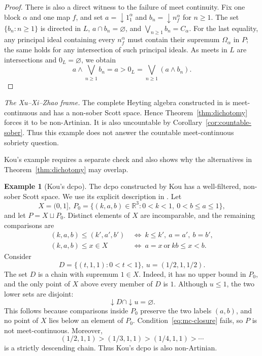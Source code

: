 \documentclass[11pt,reqno]{amsart}
\theoremstyle{definition}
\newtheorem{example}[theorem]{Example}
\numberwithin{equation}{section}
\begin{document}
\begin{proof}
There is also a direct witness to the failure of meet continuity.
Fix one block $\alpha$ and one map $f$, and set
$a={\downarrow}1_1^\alpha$ and $b_n={\downarrow}n_f^\alpha$
for $n\geq1$. The set $\{b_n:n\geq1\}$ is directed in $L$,
$a\cap b_n=\varnothing$, and $\bigvee_{n\geq1}b_n=C_\alpha$.
For the last equality, any principal ideal containing every
$n_f^\alpha$ must contain their supremum $\Omega_\alpha$ in $P$;
the same holds for any intersection of such principal ideals.
As meets in $L$ are intersections and $0_L=\varnothing$, we obtain
\begin{equation}\label{eq:isbell-mc-failure}
  a\wedge\bigvee_{n\geq1}b_n
  =a>0_L=\bigvee_{n\geq1}(a\wedge b_n).
\end{equation}
\end{proof}

\emph{The Xu--Xi--Zhao frame.}
The complete Heyting algebra constructed in \citet{XuXiZhao2021} is
meet-continuous and has a non-sober Scott space. Hence
Theorem~\ref{thm:dichotomy} forces it to be non-Artinian.
It is also uncountable by Corollary~\ref{cor:countable-sober}.
Thus this example does not answer the countable meet-continuous
sobriety question.

Kou's example requires a separate check and also shows why the
alternatives in Theorem~\ref{thm:dichotomy} may overlap.

\begin{example}[Kou's dcpo]\label{ex:kou}
The dcpo constructed by Kou \citep{Kou2001} has a well-filtered,
non-sober Scott space. We use its explicit description in
\citet[Example~3.11]{ZhaoXu2018}. Let
\[
  X=(0,1],~
  P_0=\{(k,a,b)\in\mathbb R^3:0<k<1,\ 0<b\leq a\leq1\},
\]
and let $P=X\sqcup P_0$. Distinct elements of $X$ are incomparable,
and the remaining comparisons are
\begin{align*}
  (k,a,b)\leq(k',a',b')
    &\ \Longleftrightarrow\ k\leq k',\ a=a',\ b=b',\\
  (k,a,b)\leq x\in X
    &\ \Longleftrightarrow\ a=x\ \text{or}\ kb\leq x<b.
\end{align*}
Consider
\[
  D=\{(t,1,1):0<t<1\},~ u=(1/2,1,1/2).
\]
The set $D$ is a chain with supremum $1\in X$. Indeed, it has no upper
bound in $P_0$, and the only point of $X$ above every member of $D$ is
$1$. Although $u\leq1$, the two lower sets are disjoint:
\[
  {\downarrow} D\cap{\downarrow} u=\varnothing.
\]
This follows because comparisons inside $P_0$ preserve the two labels
$(a,b)$, and no point of $X$ lies below an element of $P_0$.
Condition~\eqref{eq:mc-closure} fails, so $P$ is not meet-continuous.
Moreover,
\[
  (1/2,1,1)>(1/3,1,1)>(1/4,1,1)>\cdots
\]
is a strictly descending chain. Thus Kou's dcpo is also non-Artinian.
\end{example}
\end{document}
